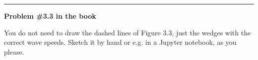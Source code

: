 \documentclass[11pt]{article}
\begin{document}



\vskip 1cm
\hrule
{\bf Problem \#3.3 in the book}

You do not need to draw the dashed lines of Figure 3.3, just the wedges with
the correct wave speeds.  Sketch it by hand or e.g. in a Jupyter notebook,
as you please.




\end{document}
